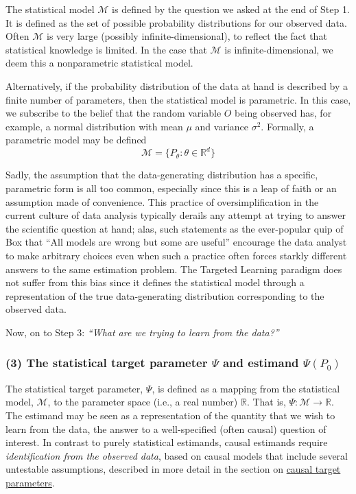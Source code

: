 \documentclass[12pt, krantz2,]{krantz}
\theoremstyle{definition}
\theoremstyle{definition}
\theoremstyle{definition}
\newcommand{\R}{\mathbb{R}}
\newcommand{\M}{\mathcal{M}}
\newcommand{\1}{\mathbbm{1}}
\begin{document}
The statistical model \(\M\) is defined by the question we asked at the end of
Step 1. It is defined as the set of possible probability distributions for our
observed data. Often \(\M\) is very large (possibly infinite-dimensional), to
reflect the fact that statistical knowledge is limited. In the case that \(\M\) is
infinite-dimensional, we deem this a nonparametric statistical model.

Alternatively, if the probability distribution of the data at hand is described
by a finite number of parameters, then the statistical model is parametric. In
this case, we subscribe to the belief that the random variable \(O\) being
observed has, for example, a normal distribution with mean \(\mu\) and variance
\(\sigma^2\). Formally, a parametric model may be defined
\begin{equation*}
  \M = \{P_{\theta} : \theta \in \R^d \}
\end{equation*}

Sadly, the assumption that the data-generating distribution has a specific,
parametric form is all too common, especially since this is a leap of faith or
an assumption made of convenience. This practice of oversimplification in the
current culture of data analysis typically derails any attempt at trying to
answer the scientific question at hand; alas, such statements as the
ever-popular quip of Box that ``All models are wrong but some are useful''
encourage the data analyst to make arbitrary choices even when such a practice
often forces starkly different answers to the same estimation problem. The
Targeted Learning paradigm does not suffer from this bias since it defines the
statistical model through a representation of the true data-generating
distribution corresponding to the observed data.

Now, on to Step 3: \emph{``What are we trying to learn from the data?''}

\hypertarget{the-statistical-target-parameter-psi-and-estimand-psip_0}{%
\subsubsection*{\texorpdfstring{(3) The statistical target parameter \(\Psi\) and estimand \(\Psi(P_0)\)}{(3) The statistical target parameter \textbackslash{}Psi and estimand \textbackslash{}Psi(P\_0)}}\label{the-statistical-target-parameter-psi-and-estimand-psip_0}}


The statistical target parameter, \(\Psi\), is defined as a mapping from the
statistical model, \(\M\), to the parameter space (i.e., a real number) \(\R\). That
is, \(\Psi: \M \rightarrow \R\). The estimand may be seen as a representation of
the quantity that we wish to learn from the data, the answer to a well-specified
(often causal) question of interest. In contrast to purely statistical
estimands, causal estimands require \emph{identification from the observed data},
based on causal models that include several untestable assumptions, described in
more detail in the section on \protect\hyperlink{causal}{causal target parameters}.
\end{document}
